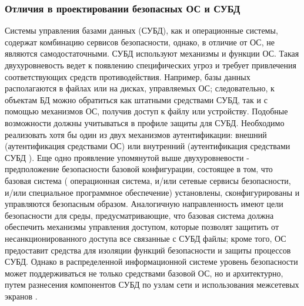 \subsubsection{Отличия в проектировании безопасных ОС и СУБД}
Системы управления базами данных (СУБД), как и операционные системы, содержат комбинацию сервисов
безопасности, однако, в отличие от ОС, не являются самодостаточными. СУБД используют механизмы
и функции ОС. Такая двухуровневость ведет к появлению специфических угроз и требует привлечения
соответствующих средств противодействия. Например, базы данных располагаются в файлах или на дисках,
управляемых ОС; следовательно, к объектам БД можно обратиться как штатными средствами СУБД, так и с
помощью механизмов ОС, получив доступ к файлу или устройству.
Подобные возможности должны учитываться в профиле защиты для СУБД.
Необходимо реализовать хотя бы один из двух механизмов аутентификации: внешний (аутентификация средствами ОС)
или внутренний (аутентификация средствами СУБД ).
Еще одно проявление упомянутой выше двухуровневости - предположение безопасности базовой конфигурации,
состоящее в том, что базовая система ( операционная система, и/или сетевые сервисы безопасности, и/или
специальное программное обеспечение) установлены, сконфигурированы и управляются безопасным образом.
Аналогичную направленность имеют цели безопасности для среды, предусматривающие, что базовая система
должна обеспечить механизмы управления доступом, которые позволят защитить от несанкционированного доступа
все связанные с СУБД файлы; кроме того, ОС предоставит средства для изоляции функций безопасности и защиты процессов СУБД.
Однако в распределенной информационной системе уровень безопасности может поддерживаться не только средствами базовой ОС,
но и архитектурно, путем разнесения компонентов СУБД по узлам сети и использования межсетевых экранов \autocite{security-db}.

